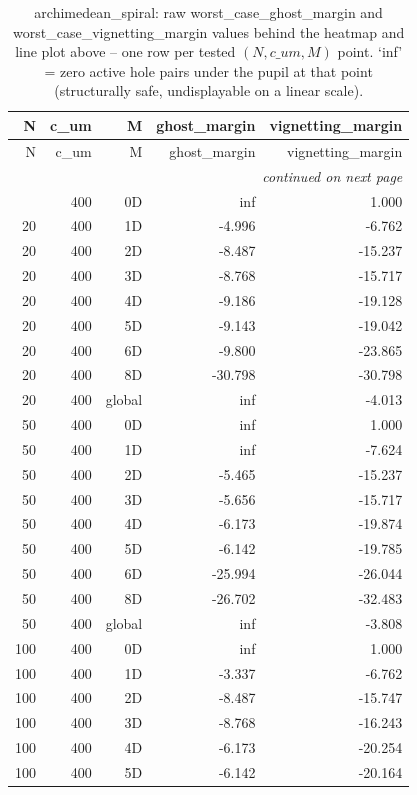 \begin{longtable}{rrrrr}
\caption{archimedean\_spiral: raw worst\_case\_ghost\_margin and worst\_case\_vignetting\_margin values behind the heatmap and line plot above -- one row per tested $(N, c\_um, M)$ point. `inf' = zero active hole pairs under the pupil at that point (structurally safe, undisplayable on a linear scale).} \\
\toprule
N & c\_um & M & ghost\_margin & vignetting\_margin \\
\midrule
\endfirsthead
\toprule
N & c\_um & M & ghost\_margin & vignetting\_margin \\
\midrule
\endhead
\midrule
\multicolumn{5}{r}{\itshape continued on next page} \\
\endfoot
\bottomrule
\endlastfoot
20 & 400 & 0D & inf & 1.000 \\
20 & 400 & 1D & -4.996 & -6.762 \\
20 & 400 & 2D & -8.487 & -15.237 \\
20 & 400 & 3D & -8.768 & -15.717 \\
20 & 400 & 4D & -9.186 & -19.128 \\
20 & 400 & 5D & -9.143 & -19.042 \\
20 & 400 & 6D & -9.800 & -23.865 \\
20 & 400 & 8D & -30.798 & -30.798 \\
20 & 400 & global & inf & -4.013 \\
50 & 400 & 0D & inf & 1.000 \\
50 & 400 & 1D & inf & -7.624 \\
50 & 400 & 2D & -5.465 & -15.237 \\
50 & 400 & 3D & -5.656 & -15.717 \\
50 & 400 & 4D & -6.173 & -19.874 \\
50 & 400 & 5D & -6.142 & -19.785 \\
50 & 400 & 6D & -25.994 & -26.044 \\
50 & 400 & 8D & -26.702 & -32.483 \\
50 & 400 & global & inf & -3.808 \\
100 & 400 & 0D & inf & 1.000 \\
100 & 400 & 1D & -3.337 & -6.762 \\
100 & 400 & 2D & -8.487 & -15.747 \\
100 & 400 & 3D & -8.768 & -16.243 \\
100 & 400 & 4D & -6.173 & -20.254 \\
100 & 400 & 5D & -6.142 & -20.164 \\

\end{longtable}
